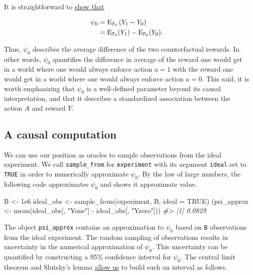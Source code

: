 \documentclass[
  11pt,
  openright,twoside]{book}
\newenvironment{Shaded}{\begin{snugshade}}{\end{snugshade}}
\newcommand{\AttributeTok}[1]{\textcolor[rgb]{0.77,0.63,0.00}{#1}}
\newcommand{\CommentTok}[1]{\textcolor[rgb]{0.56,0.35,0.01}{\textit{#1}}}
\newcommand{\ConstantTok}[1]{\textcolor[rgb]{0.00,0.00,0.00}{#1}}
\newcommand{\FloatTok}[1]{\textcolor[rgb]{0.00,0.00,0.81}{#1}}
\newcommand{\FunctionTok}[1]{\textcolor[rgb]{0.00,0.00,0.00}{#1}}
\newcommand{\NormalTok}[1]{#1}
\newcommand{\OtherTok}[1]{\textcolor[rgb]{0.56,0.35,0.01}{#1}}
\newcommand{\SpecialCharTok}[1]{\textcolor[rgb]{0.00,0.00,0.00}{#1}}
\newcommand{\StringTok}[1]{\textcolor[rgb]{0.31,0.60,0.02}{#1}}
\newcommand{\bbP}{\mathbb{P}}
\newcommand{\Exp}{\textrm{E}}
\theoremstyle{definition}
\theoremstyle{definition}
\theoremstyle{definition}
\theoremstyle{definition}
\theoremstyle{remark}
\begin{document}
It is straightforward to \protect\hyperlink{identification}{show that}

\begin{align}
\psi_{0} &= \Exp_{\bbP_{0}} \left(Y_{1} - Y_{0}\right) \label{eq:psi-zero-bis} \\
&= \Exp_{\bbP_{0}}(Y_1) - \Exp_{\bbP_{0}}(Y_0).  \notag 
\end{align}

Thus, \(\psi_{0}\) describes the average difference of the two counterfactual
rewards. In other words, \(\psi_{0}\) quantifies the difference in average of
the reward one would get in a world where one would always enforce action
\(a=1\) with the reward one would get in a world where one would always enforce
action \(a=0\). This said, it is worth emphasizing that \(\psi_{0}\) is a
well-defined parameter beyond its causal interpretation, and that it describes
a standardized association between the action \(A\) and reward \(Y\).

\hypertarget{causal-computation}{%
\subsection{A causal computation}\label{causal-computation}}

We can use our position as oracles to sample observations from the ideal
experiment. We call \texttt{sample\_from} for \texttt{experiment} with its argument \texttt{ideal}
set to \texttt{TRUE} in order to numerically approximate \(\psi_{0}\). By the law of
large numbers, the following code approximates \(\psi_{0}\) and shows it
approximate value.

\begin{Shaded}
\begin{Highlighting}[]
\NormalTok{B }\OtherTok{\textless{}{-}} \FloatTok{1e6}
\NormalTok{ideal\_obs }\OtherTok{\textless{}{-}} \FunctionTok{sample\_from}\NormalTok{(experiment, B, }\AttributeTok{ideal =} \ConstantTok{TRUE}\NormalTok{)}
\NormalTok{(psi\_approx }\OtherTok{\textless{}{-}} \FunctionTok{mean}\NormalTok{(ideal\_obs[, }\StringTok{"Yone"}\NormalTok{] }\SpecialCharTok{{-}}\NormalTok{ ideal\_obs[, }\StringTok{"Yzero"}\NormalTok{]))}
\CommentTok{\#\textgreater{} [1] 0.0829}
\end{Highlighting}
\end{Shaded}

The object \texttt{psi\_approx} contains an approximation to \(\psi_0\) based on \texttt{B}
observations from the ideal experiment. The random sampling of observations
results in uncertainty in the numerical approximation of \(\psi_0\). This
uncertainty can be quantified by constructing a 95\% confidence interval for
\(\psi_0\). The central limit theorem and Slutsky's lemma \protect\hyperlink{clt}{allow us} to
build such an interval as follows.
\end{document}
